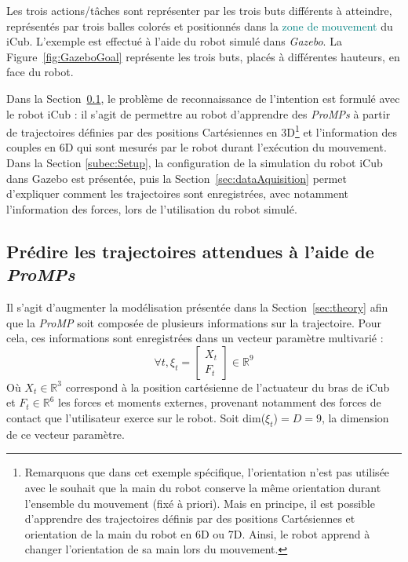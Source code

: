 \documentclass[utf8]{frontiersSCNS} %
\newcommand{\toimprove}[1]{\textcolor{teal}{#1}}
\begin{document}
Les trois actions/tâches sont représenter par les trois buts différents à atteindre, représentés par trois balles colorés et positionnés dans la \toimprove{zone de mouvement} du iCub. L'exemple est effectué à l'aide du robot simulé dans \textit{Gazebo}. La Figure~\ref{fig:GazeboGoal} représente les trois buts, placés à différentes hauteurs, en face du robot.

Dans la Section~\ref{sec:formulateModelInt}, le problème de reconnaissance de l'intention est formulé avec le robot iCub : il s'agit de permettre au robot d'apprendre des \textit{ProMPs} à partir de trajectoires définies par des positions Cartésiennes en 3D\footnote{Remarquons que dans cet exemple spécifique, l'orientation n'est pas utilisée avec le souhait que la main du robot conserve la même orientation durant l'ensemble du mouvement (fixé à priori). Mais en principe, il est possible d'apprendre des trajectoires définis par des positions Cartésiennes et orientation de la main du robot en 6D ou 7D. Ainsi, le robot apprend à changer l'orientation de sa main lors du mouvement.} et l'information des couples en 6D qui sont mesurés par le robot durant l’exécution du mouvement.
Dans la Section \ref{subec:Setup}, la configuration de la simulation du robot iCub dans Gazebo est présentée, puis la Section~\ref{sec:dataAquisition} permet d'expliquer comment les trajectoires sont enregistrées, avec notamment l'information des forces, lors de l'utilisation du robot simulé.


\subsection{Prédire les trajectoires attendues à l'aide de \textit{ProMPs}}\label{sec:formulateModelInt}

Il s'agit d'augmenter la modélisation présentée dans la Section~\ref{sec:theory} afin que la \textit{ProMP} soit composée de plusieurs informations sur la trajectoire. Pour cela, ces informations sont enregistrées dans un vecteur paramètre multivarié :
$$\forall t, \xi_t=\begin{bmatrix} X_t \\ F_t\end{bmatrix} \in \mathbb{R}^{9}$$ 
Où $X_t \in \mathbb{R}^{3}$ correspond à la position cartésienne de l'actuateur du bras de iCub et $F_t \in \mathbb{R}^6$ les forces et moments externes, provenant notamment des forces de contact que l'utilisateur exerce sur le robot. Soit dim($\xi_t$)$ = D = 9$, la dimension de ce vecteur paramètre. %
\end{document}
